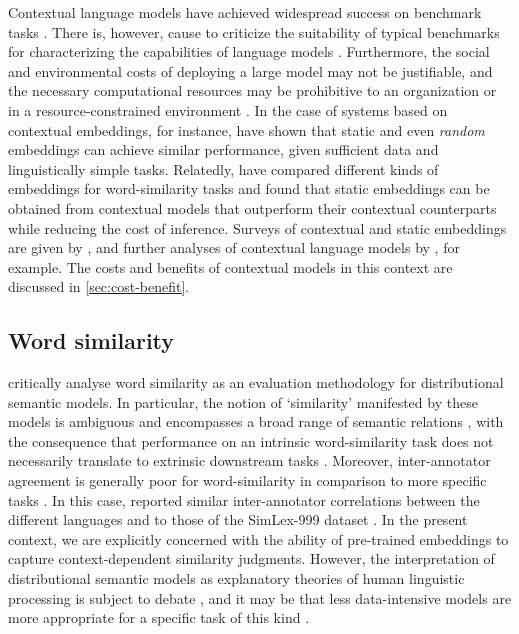 Contextual language models have achieved widespread success on benchmark tasks
\parencite[22-27]{Bommasani2022}.
There is, however, cause to criticize the suitability of typical benchmarks for
characterizing the capabilities of language models \parencite[5-6]{Srivastava2023}.
Furthermore, the social and environmental costs of deploying a large model may not be
justifiable, and the necessary computational resources may be prohibitive to an
organization or in a resource-constrained environment
\parencite[142-145,154]{Bommasani2022}.
In the case of systems based on contextual embeddings, for instance,
\textcite{Arora2020} have shown that static and even \emph{random} embeddings can
achieve similar performance, given sufficient data and linguistically simple tasks.
Relatedly, \textcites[5244-5246]{Gupta2019}[4760-4762]{Bommasani2020} have compared
different kinds of embeddings for word-similarity tasks and found that static
embeddings can be obtained from contextual models that outperform their contextual
counterparts while reducing the cost of inference.
Surveys of contextual and static embeddings are given by
\textcites{Liu2020}{Torregrossa2021}, and further analyses of contextual language
models by \textcites{Reif2019}{Brunner2019}, for example.
The costs and benefits of contextual models in this context are discussed in
\cref{sec:cost-benefit}.

\subsection{Word similarity}

\textcite{Batchkarov2016} critically analyse word similarity as an evaluation
methodology for distributional semantic models.
In particular, the notion of `similarity' manifested by these models is ambiguous
\parencite{Elekes2020} and encompasses a broad range of semantic relations
\parencite[2]{Pado2003}, with the consequence that performance on an intrinsic
word-similarity task does not necessarily translate to extrinsic downstream tasks
\parencite[7-8]{Batchkarov2016}.
Moreover, inter-annotator agreement is generally poor for word-similarity in comparison
to more specific tasks \parencite[8-9]{Batchkarov2016}.
In this case, \textcites[8]{Armendariz2020}[42]{Armendariz2020a} reported similar
inter-annotator correlations between the different languages and to those of the
SimLex-999 dataset \parencite[678-680]{Hill2015}.
In the present context, we are explicitly concerned with the ability of pre-trained
embeddings to capture context-dependent similarity judgments.
However, the interpretation of distributional semantic models as explanatory theories
of human linguistic processing is subject to debate \parencite{Gunther2019}, and it may
be that less data-intensive models are more appropriate for a specific task of this
kind \parencite{DeDeyne2016}.
